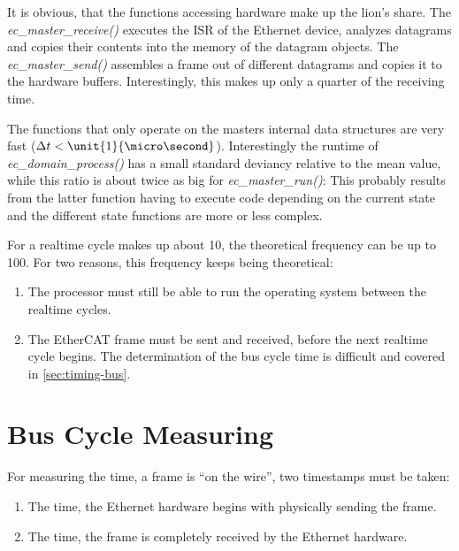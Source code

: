 \documentclass[a4paper,12pt,BCOR6mm,bibtotoc,idxtotoc]{scrbook}
\begin{document}
It is obvious, that the functions accessing hardware make up the
lion's share. The \textit{ec\_master\_receive()} executes the ISR of
the Ethernet device, analyzes datagrams and copies their contents into
the memory of the datagram objects. The \textit{ec\_master\_send()}
assembles a frame out of different datagrams and copies it to the
hardware buffers. Interestingly, this makes up only a quarter of the
receiving time.

The functions that only operate on the masters internal data structures are
very fast ($\Delta t < \unit{1}{\micro\second}$). Interestingly the runtime of
\textit{ec\_domain\_process()} has a small standard deviancy relative to the
mean value, while this ratio is about twice as big for
\textit{ec\_master\_run()}: This probably results from the latter function
having to execute code depending on the current state and the different state
functions are more or less complex.

For a realtime cycle makes up about \unit{10}{\micro\second}, the theoretical
frequency can be up to \unit{100}{\kilo\hertz}. For two reasons, this frequency
keeps being theoretical:

\begin{enumerate}

\item The processor must still be able to run the operating system between the
realtime cycles.

\item The EtherCAT frame must be sent and received, before the next realtime
cycle begins. The determination of the bus cycle time is difficult and covered
in \autoref{sec:timing-bus}.

\end{enumerate}


\section{Bus Cycle Measuring}
\label{sec:timing-bus}

For measuring the time, a frame is ``on the wire'', two timestamps must be
taken:

\begin{enumerate}

\item The time, the Ethernet hardware begins with physically sending the
frame.

\item The time, the frame is completely received by the Ethernet hardware.

\end{enumerate}
\end{document}
